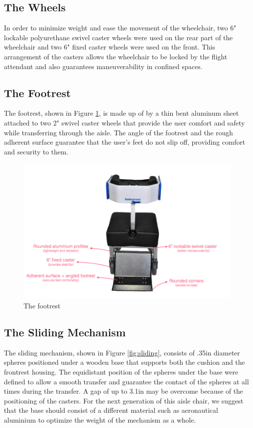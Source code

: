 \subsection{The Wheels}
In order to minimize weight and ease the movement of the wheelchair, two 6" lockable polyurethane swivel caster wheels were used on the rear part of the wheelchair and two 6" fixed caster wheels were used on the front. This arrangement of the casters allows the wheelchair to be locked by the flight attendant and also guarantees maneuverability in confined spaces.




\subsection{The Footrest}

The footrest, shown in Figure \ref{fig:footrest},  is made up of by a thin bent aluminum sheet attached to two 2" swivel caster wheels that provide the user comfort and safety while transferring through the aisle. The angle of the footrest and the rough adherent surface guarantee that the user's feet do not slip off, providing comfort and security to them.
 

\begin{figure}[h]
\centering
\includegraphics[width=13cm]{images/AisleWheelchair2.png}
\caption{The footrest}
\label{fig:footrest}
\end{figure}

\subsection{The Sliding Mechanism}

The sliding mechanism, shown in Figure \ref{fig:sliding},  consists of .35in diameter spheres positioned under a wooden base that supports both the cushion and the frontrest housing. The equidistant position of the spheres under the base were defined to allow a smooth transfer and  guarantee the contact of the spheres at all times during the transfer. A gap of up to 3.1in may be overcome because of the positioning of the casters. For the next generation of this aisle chair, we suggest that the base should consist of a different material such as aeronautical aluminium to optimize the weight of the mechanism as a whole.

